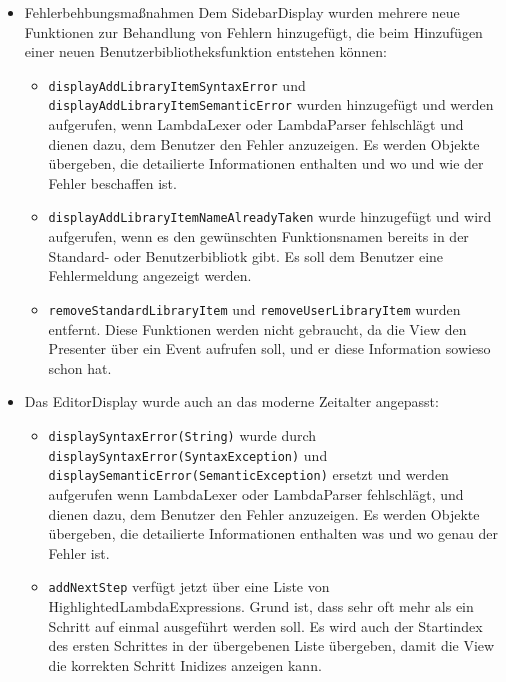 \documentclass[parskip=full,11pt,twoside]{scrartcl}
\begin{document}
\begin{itemize}
    \item Fehlerbehbungsmaßnahmen  \newline
    Dem SidebarDisplay wurden mehrere neue Funktionen zur Behandlung von Fehlern hinzugefügt, die beim Hinzufügen einer neuen Benutzerbibliotheksfunktion entstehen können:
    	\begin{itemize}
        	\item \texttt{displayAddLibraryItemSyntaxError} und \newline
        	\texttt{displayAddLibraryItemSemanticError} wurden hinzugefügt und werden aufgerufen, wenn LambdaLexer oder LambdaParser fehlschlägt und dienen dazu, dem Benutzer den Fehler anzuzeigen. Es werden Objekte übergeben, die detailierte Informationen enthalten und wo und wie der Fehler beschaffen ist.
        	\item \texttt{displayAddLibraryItemNameAlreadyTaken} wurde hinzugefügt und wird aufgerufen, wenn es den gewünschten Funktionsnamen bereits in der Standard- oder Benutzerbibliotk gibt. Es soll dem Benutzer eine Fehlermeldung angezeigt werden.
            \item \texttt{removeStandardLibraryItem} und \newline
            	\texttt{removeUserLibraryItem} wurden entfernt. Diese Funktionen werden nicht gebraucht, da die View den Presenter über ein Event aufrufen soll, und er diese Information sowieso schon hat.
        \end{itemize}
    \item Das EditorDisplay wurde auch an das moderne Zeitalter angepasst:
    	\begin{itemize}
    		\item \texttt{displaySyntaxError(String)} wurde
            durch \newline \texttt{displaySyntaxError(SyntaxException)} und \newline
        	\texttt{displaySemanticError(SemanticException)} ersetzt und werden aufgerufen wenn LambdaLexer oder LambdaParser fehlschlägt, und dienen dazu, dem Benutzer den Fehler anzuzeigen. Es werden Objekte übergeben, die detailierte Informationen enthalten was und wo genau der Fehler ist.
            \item \texttt{addNextStep} verfügt jetzt über eine Liste von HighlightedLambdaExpressions. Grund ist, dass sehr oft mehr als ein Schritt auf einmal ausgeführt werden soll. Es wird auch der Startindex des ersten Schrittes in der übergebenen Liste übergeben, damit die View die korrekten Schritt Inidizes anzeigen kann.

\end{itemize}
\end{itemize}
\end{document}
